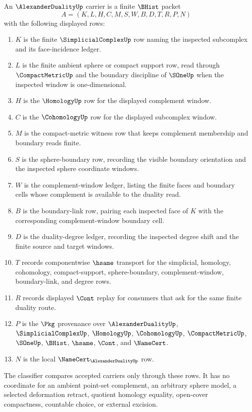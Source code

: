 \begin{definition}
\label{def:alexander-duality-carrier}
An $\AlexanderDualityUp$ carrier is a finite $\BHist$ packet
$$
A=(K,L,H,C,M,S,W,B,D,T,R,P,N)
$$
with the following displayed rows:
\begin{enumerate}
\item $K$ is the finite $\SimplicialComplexUp$ row naming the inspected subcomplex and its face-incidence ledger.
\item $L$ is the finite ambient sphere or compact support row, read through $\CompactMetricUp$ and the boundary discipline of $\SOneUp$ when the inspected window is one-dimensional.
\item $H$ is the $\HomologyUp$ row for the displayed complement window.
\item $C$ is the $\CohomologyUp$ row for the displayed subcomplex window.
\item $M$ is the compact-metric witness row that keeps complement membership and boundary reads finite.
\item $S$ is the sphere-boundary row, recording the visible boundary orientation and the inspected sphere coordinate windows.
\item $W$ is the complement-window ledger, listing the finite faces and boundary cells whose complement is available to the duality read.
\item $B$ is the boundary-link row, pairing each inspected face of $K$ with the corresponding complement-window boundary cell.
\item $D$ is the duality-degree ledger, recording the inspected degree shift and the finite source and target windows.
\item $T$ records componentwise $\hsame$ transport for the simplicial, homology, cohomology, compact-support, sphere-boundary, complement-window, boundary-link, and degree rows.
\item $R$ records displayed $\Cont$ replay for consumers that ask for the same finite duality route.
\item $P$ is the $\Pkg$ provenance over $\AlexanderDualityUp$, $\SimplicialComplexUp$, $\HomologyUp$, $\CohomologyUp$, $\CompactMetricUp$, $\SOneUp$, $\BHist$, $\hsame$, $\Cont$, and $\NameCert$.
\item $N$ is the local $\NameCert_{\AlexanderDualityUp}$ row.
\end{enumerate}
The classifier compares accepted carriers only through these rows. It has no coordinate for an ambient point-set complement, an arbitrary sphere model, a selected deformation retract, quotient homology equality, open-cover compactness, countable choice, or external excision.
\end{definition}

